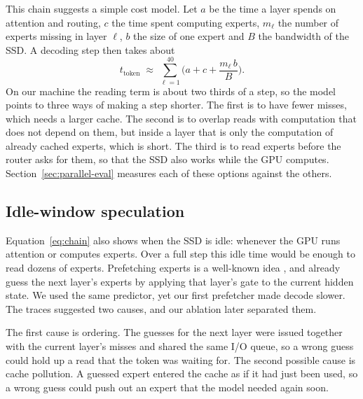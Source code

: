 This chain suggests a simple cost model. Let $a$ be the time a layer spends on attention and routing, $c$ the time spent computing experts, $m_\ell$ the number of experts missing in layer $\ell$, $b$ the size of one expert and $B$ the bandwidth of the SSD. A decoding step then takes about
\begin{equation}
t_{\text{token}} \;\approx\; \sum_{\ell=1}^{40}\Big(a + c + \frac{m_\ell\, b}{B}\Big).
\label{eq:chain}
\end{equation}
On our machine the reading term is about two thirds of a step, so the model points to three ways of making a step shorter. The first is to have fewer misses, which needs a larger cache. The second is to overlap reads with computation that does not depend on them, but inside a layer that is only the computation of already cached experts, which is short. The third is to read experts before the router asks for them, so that the SSD also works while the GPU computes. Section~\ref{sec:parallel-eval} measures each of these options against the others.

\subsection{Idle-window speculation}
\label{sec:spec}
Equation~\eqref{eq:chain} also shows when the SSD is idle: whenever the GPU runs attention or computes experts. Over a full step this idle time would be enough to read dozens of experts. Prefetching experts is a well-known idea \citep{moeoffload,pregated,moeinfinity,promoe,adapmoe}, and \citet{moeoffload} already guess the next layer's experts by applying that layer's gate to the current hidden state. We used the same predictor, yet our first prefetcher made decode slower. The traces suggested two causes, and our ablation later separated them.

The first cause is ordering. The guesses for the next layer were issued together with the current layer's misses and shared the same I/O queue, so a wrong guess could hold up a read that the token was waiting for. The second possible cause is cache pollution. A guessed expert entered the cache as if it had just been used, so a wrong guess could push out an expert that the model needed again soon.

